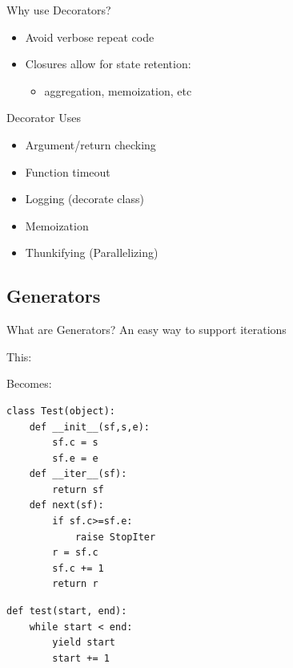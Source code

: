 \documentclass[11pt]{beamer}
\begin{document}
\begin{frame}[fragile]{Why use Decorators?}
    \begin{itemize}
        \item Avoid verbose repeat code
        \item Closures allow for state retention:
        \begin{itemize}
            \item[] aggregation, memoization, etc
        \end{itemize}
    \end{itemize}
\end{frame}

\begin{frame}[fragile]{Decorator Uses}
    \begin{itemize}
        \item Argument/return checking
        \item Function timeout
        \item Logging (decorate class)
        \item Memoization
        \item Thunkifying (Parallelizing)
    \end{itemize}
\end{frame}

\subsection{Generators}
\begin{frame}[fragile]{What are Generators?}
    An easy way to support iterations \\

    \begin{minipage}{0.45\linewidth}
        This:
    \end{minipage}
    \begin{minipage}{0.45\linewidth}
        Becomes:
    \end{minipage}

    \begin{minipage}{0.45\linewidth}
        \begin{lstlisting}
class Test(object):
    def __init__(sf,s,e):
        sf.c = s
        sf.e = e
    def __iter__(sf):
        return sf
    def next(sf):
        if sf.c>=sf.e:
            raise StopIter
        r = sf.c
        sf.c += 1
        return r
        \end{lstlisting}
    \end{minipage}
    \pause
    \begin{minipage}{0.45\linewidth}
        \begin{lstlisting}
def test(start, end):
    while start < end:
        yield start
        start += 1
        \end{lstlisting}
    \end{minipage}
\end{frame}
\end{document}
